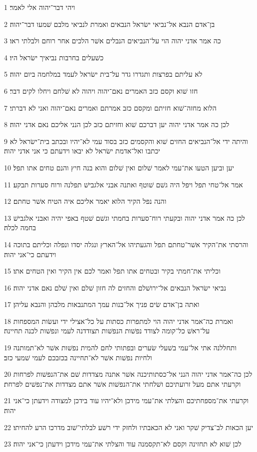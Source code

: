 \par 1 ויהי דבר־יהוה אלי לאמר׃
\par 2 בן־אדם הנבא אל־נביאי ישׂראל הנבאים ואמרת לנביאי מלבם שׁמעו דבר־יהוה׃
\par 3 כה אמר אדני יהוה הוי על־הנביאים הנבלים אשׁר הלכים אחר רוחם ולבלתי ראו׃
\par 4 כשׁעלים בחרבות נביאיך ישׂראל היו׃
\par 5 לא עליתם בפרצות ותגדרו גדר על־בית ישׂראל לעמד במלחמה ביום יהוה׃
\par 6 חזו שׁוא וקסם כזב האמרים נאם־יהוה ויהוה לא שׁלחם ויחלו לקים דבר׃
\par 7 הלוא מחזה־שׁוא חזיתם ומקסם כזב אמרתם ואמרים נאם־יהוה ואני לא דברתי׃
\par 8 לכן כה אמר אדני יהוה יען דברכם שׁוא וחזיתם כזב לכן הנני אליכם נאם אדני יהוה׃
\par 9 והיתה ידי אל־הנביאים החזים שׁוא והקסמים כזב בסוד עמי לא־יהיו ובכתב בית־ישׂראל לא יכתבו ואל־אדמת ישׂראל לא יבאו וידעתם כי אני אדני יהוה׃
\par 10 יען וביען הטעו את־עמי לאמר שׁלום ואין שׁלום והוא בנה חיץ והנם טחים אתו תפל׃
\par 11 אמר אל־טחי תפל ויפל היה גשׁם שׁוטף ואתנה אבני אלגבישׁ תפלנה ורוח סערות תבקע׃
\par 12 והנה נפל הקיר הלוא יאמר אליכם איה הטיח אשׁר טחתם׃
\par 13 לכן כה אמר אדני יהוה ובקעתי רוח־סערות בחמתי וגשׁם שׁטף באפי יהיה ואבני אלגבישׁ בחמה לכלה׃
\par 14 והרסתי את־הקיר אשׁר־טחתם תפל והגעתיהו אל־הארץ ונגלה יסדו ונפלה וכליתם בתוכה וידעתם כי־אני יהוה׃
\par 15 וכליתי את־חמתי בקיר ובטחים אתו תפל ואמר לכם אין הקיר ואין הטחים אתו׃
\par 16 נביאי ישׂראל הנבאים אל־ירושׁלם והחזים לה חזון שׁלם ואין שׁלם נאם אדני יהוה׃
\par 17 ואתה בן־אדם שׂים פניך אל־בנות עמך המתנבאות מלבהן והנבא עליהן׃
\par 18 ואמרת כה־אמר אדני יהוה הוי למתפרות כסתות על כל־אצילי ידי ועשׂות המספחות על־ראשׁ כל־קומה לצודד נפשׁות הנפשׁות תצודדנה לעמי ונפשׁות לכנה תחיינה׃
\par 19 ותחללנה אתי אל־עמי בשׁעלי שׂערים ובפתותי לחם להמית נפשׁות אשׁר לא־תמותנה ולחיות נפשׁות אשׁר לא־תחיינה בכזבכם לעמי שׁמעי כזב׃
\par 20 לכן כה־אמר אדני יהוה הנני אל־כסתותיכנה אשׁר אתנה מצדדות שׁם את־הנפשׁות לפרחות וקרעתי אתם מעל זרועתיכם ושׁלחתי את־הנפשׁות אשׁר אתם מצדדות את־נפשׁים לפרחת׃
\par 21 וקרעתי את־מספחתיכם והצלתי את־עמי מידכן ולא־יהיו עוד בידכן למצודה וידעתן כי־אני יהוה׃
\par 22 יען הכאות לב־צדיק שׁקר ואני לא הכאבתיו ולחזק ידי רשׁע לבלתי־שׁוב מדרכו הרע להחיתו׃
\par 23 לכן שׁוא לא תחזינה וקסם לא־תקסמנה עוד והצלתי את־עמי מידכן וידעתן כי־אני יהוה׃

